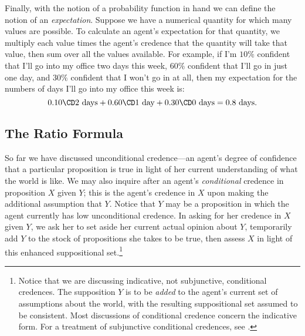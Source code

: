 Finally, with the notion of a probability function in hand we can define the notion of an \textit{expectation}. Suppose we have a numerical quantity for which many values are possible. To calculate an agent's expectation for that quantity, we multiply each value times the agent's credence that the quantity will take that value, then sum over all the values available. For example, if I'm $10\%$ confident that I'll go into my office two days this week, $60\%$ confident that I'll go in just one day, and $30\%$ confident that I won't go in at all, then my expectation for the numbers of days I'll go into my office this week is:
\begin{equation}
0.10 \CD 2 \text{ days}+ 0.60 \CD 1 \text{ day} + 0.30 \CD 0 \text{ days}=0.8 \text{ days.}
\end{equation}



\subsection{The Ratio Formula}\label{ss:Ratio}

So far we have discussed unconditional credence---an agent's degree of confidence that a particular proposition is true in light of her current understanding of what the world is like. We may also inquire after an agent's \emph{conditional} credence in proposition $X$ given $Y$; this is the agent's credence in $X$ upon making the additional assumption that $Y$. Notice that $Y$ may be a proposition in which the agent currently has low unconditional credence. In asking for her credence in $X$ given $Y$, we ask her to set aside her current actual opinion about $Y$, temporarily add $Y$ to the stock of propositions she takes to be true, then assess $X$ in light of this enhanced suppositional set.\footnote
{Notice that we are discussing indicative, not subjunctive, conditional credences. The supposition $Y$ is to be \emph{added} to the agent's current set of assumptions about the world, with the resulting suppositional set assumed to be consistent. Most discussions of conditional credence concern the indicative form. For a treatment of subjunctive conditional credences, see \citet{JoyceCausal}.}
 
